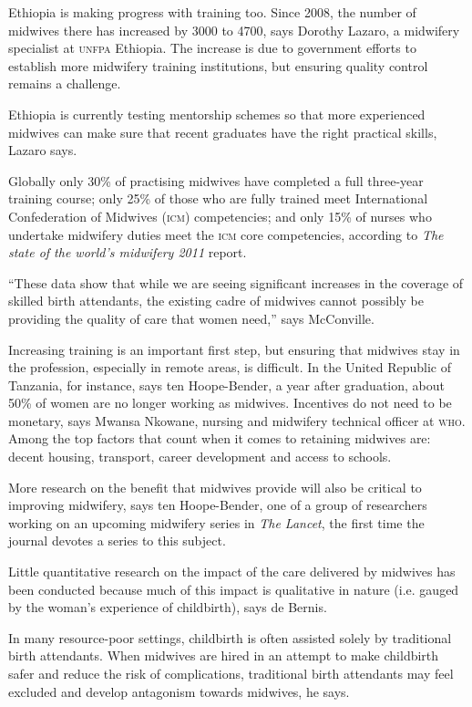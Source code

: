 \documentclass{article}
\begin{document}
Ethiopia is making progress with training too. Since 2008, the number of
midwives there has
increased by 3000 to 4700, says Dorothy Lazaro, a midwifery specialist at \textsc{unfpa}
Ethiopia. The
increase is due to government efforts to establish more midwifery training
institutions, but
ensuring quality control remains a challenge.

Ethiopia is currently testing mentorship schemes so that more experienced
midwives can make sure
that recent graduates have the right practical skills, Lazaro says.

Globally only 30\% of practising midwives have completed a full three-year
training course; only
25\% of those who are fully trained meet International Confederation of Midwives
(\textsc{icm}) competencies;
and only 15\% of nurses who undertake midwifery duties meet the \textsc{icm} core
competencies, according to
\textit{The state of the world's midwifery 2011}
report.

“These data show that while we are seeing significant increases in the coverage
of skilled
birth attendants, the existing cadre of midwives cannot possibly be providing
the quality of care
that women need,” says McConville.

Increasing training is an important first step, but ensuring that midwives stay
in the
profession, especially in remote areas, is difficult. In the United Republic of
Tanzania, for
instance, says ten Hoope-Bender, a year after graduation, about 50\% of women
are no longer working
as midwives. Incentives do not need to be monetary, says Mwansa Nkowane, nursing
and midwifery
technical officer at \textsc{who}. Among the top factors that count when it comes to
retaining midwives are:
decent housing, transport, career development and access to schools.

More research on the benefit that midwives provide will also be critical to
improving midwifery,
says ten Hoope-Bender, one of a group of researchers working on an upcoming
midwifery series in
\textit{The Lancet}, the first time the journal devotes a series to this subject.

Little quantitative research on the impact of the care delivered by midwives has
been conducted
because much of this impact is qualitative in nature (i.e. gauged by the woman's
experience
of childbirth), says de Bernis.

In many resource-poor settings, childbirth is often assisted solely by
traditional birth
attendants. When midwives are hired in an attempt to make childbirth safer and
reduce the risk of
complications, traditional birth attendants may feel excluded and develop
antagonism towards
midwives, he says.
\end{document}
